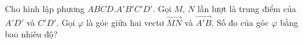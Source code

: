 \begin{ex}
Cho hình lập phương $ABCD.A'B'C'D'$. Gọi $M$, $N$ lần lượt là trung điểm của $A'D'$ và $C'D'$. Gọi $\varphi$ là góc giữa hai vectơ $\overrightarrow{MN}$ và $\overrightarrow{A'B}$. Số đo của góc $\varphi$ bằng bao nhiêu độ?
\end{ex}
